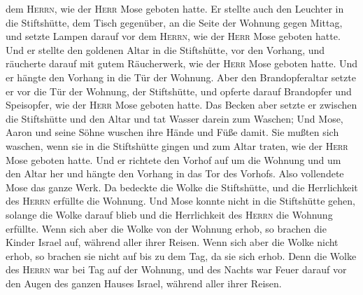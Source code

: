 dem \textsc{Herrn}, wie der \textsc{Herr} Mose geboten hatte.
 Er stellte auch den Leuchter in die Stiftshütte, dem
Tisch gegenüber, an die Seite der Wohnung gegen Mittag, 
und setzte Lampen darauf vor dem \textsc{Herrn}, wie der \textsc{Herr}
Mose geboten hatte.  Und er stellte den goldenen Altar in
die Stiftshütte, vor den Vorhang,  und räucherte darauf
mit gutem Räucherwerk, wie der \textsc{Herr} Mose geboten hatte.
 Und er hängte den Vorhang in die Tür der Wohnung.
 Aber den Brandopferaltar setzte er vor die Tür der
Wohnung, der Stiftshütte, und opferte darauf Brandopfer und Speisopfer,
wie der \textsc{Herr} Mose geboten hatte.  Das Becken
aber setzte er zwischen die Stiftshütte und den Altar und tat Wasser
darein zum Waschen;  Und Mose, Aaron und seine Söhne
wuschen ihre Hände und Füße damit.  Sie mußten sich
waschen, wenn sie in die Stiftshütte gingen und zum Altar traten, wie
der \textsc{Herr} Mose geboten hatte.  Und er richtete
den Vorhof auf um die Wohnung und um den Altar her und hängte den
Vorhang in das Tor des Vorhofs. Also vollendete Mose das ganze Werk.
 Da bedeckte die Wolke die Stiftshütte, und die
Herrlichkeit des \textsc{Herrn} erfüllte die Wohnung. 
Und Mose konnte nicht in die Stiftshütte gehen, solange die Wolke darauf
blieb und die Herrlichkeit des \textsc{Herrn} die Wohnung erfüllte.
 Wenn sich aber die Wolke von der Wohnung erhob, so
brachen die Kinder Israel auf, während aller ihrer Reisen.
 Wenn sich aber die Wolke nicht erhob, so brachen sie
nicht auf bis zu dem Tag, da sie sich erhob.  Denn die
Wolke des \textsc{Herrn} war bei Tag auf der Wohnung, und des Nachts war
Feuer darauf vor den Augen des ganzen Hauses Israel, während aller ihrer
Reisen.
